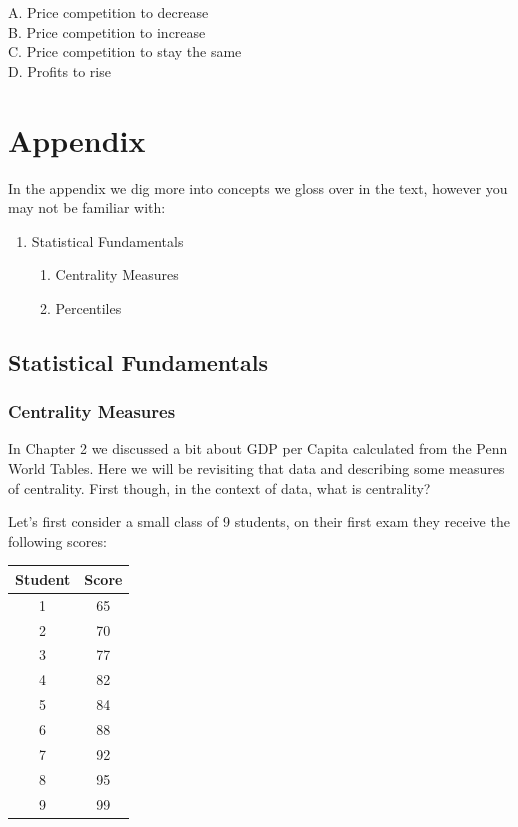 \documentclass[
]{book}
\providecommand{\tightlist}{%
  \setlength{\itemsep}{0pt}\setlength{\parskip}{0pt}}
\begin{document}
\begin{enumerate}
  A. Price competition to decrease\\
  B. Price competition to increase\\
  C. Price competition to stay the same\\
  D. Profits to rise
\end{enumerate}

\hypertarget{appendix}{%
\chapter{Appendix}\label{appendix}}

In the appendix we dig more into concepts we gloss over in the text, however you may not be familiar with:

\begin{enumerate}
\def\labelenumi{\arabic{enumi}.}
\tightlist
\item
  Statistical Fundamentals

  \begin{enumerate}
  \def\labelenumii{\alph{enumii}.}
  \tightlist
  \item
    Centrality Measures
  \item
    Percentiles
  \end{enumerate}
\end{enumerate}

\hypertarget{statistical-fundamentals}{%
\section{Statistical Fundamentals}\label{statistical-fundamentals}}

\hypertarget{centrality-measures}{%
\subsection{Centrality Measures}\label{centrality-measures}}

In Chapter 2 we discussed a bit about GDP per Capita calculated from the Penn World Tables. Here we will be revisiting that data and describing some measures of centrality. First though, in the context of data, what is centrality?

Let's first consider a small class of 9 students, on their first exam they receive the following scores:

\begin{longtable}[]{@{}cc@{}}
\toprule
Student & Score \\
\midrule
\endhead
1 & 65 \\
2 & 70 \\
3 & 77 \\
4 & 82 \\
5 & 84 \\
6 & 88 \\
7 & 92 \\
8 & 95 \\
9 & 99 \\
\bottomrule
\end{longtable}
\end{document}
